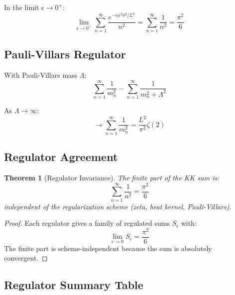 \documentclass[11pt,a4paper]{article}
\newtheorem{theorem}{Theorem}[section]
\begin{document}
In the limit $\epsilon \to 0^+$:
\begin{equation}
\label{eq:heat-kernel-limit}
\lim_{\epsilon \to 0^+} \sum_{n=1}^{\infty} \frac{e^{-\epsilon n^2 \pi^2/L^2}}{n^2} = \sum_{n=1}^{\infty} \frac{1}{n^2} = \frac{\pi^2}{6}
\end{equation}

\subsection{Pauli-Villars Regulator}
\label{subsec:pv-regulator}

With Pauli-Villars mass $\Lambda$:
\begin{equation}
\label{eq:pv-reg}
\sum_{n=1}^{\infty} \frac{1}{m_n^2} - \sum_{n=1}^{\infty} \frac{1}{m_n^2 + \Lambda^2}
\end{equation}

As $\Lambda \to \infty$:
\begin{equation}
\label{eq:pv-limit}
\to \sum_{n=1}^{\infty} \frac{1}{m_n^2} = \frac{L^2}{\pi^2} \zeta(2)
\end{equation}

\subsection{Regulator Agreement}
\label{subsec:regulator-agreement}

\begin{theorem}[Regulator Invariance]
\label{thm:regulator-invariance}
The finite part of the KK sum is:
\begin{equation}
\label{eq:finite-part}
\sum_{n=1}^{\infty} \frac{1}{n^2} = \frac{\pi^2}{6}
\end{equation}
independent of the regularization scheme (zeta, heat kernel, Pauli-Villars).
\end{theorem}

\begin{proof}
Each regulator gives a family of regulated sums $S_\epsilon$ with:
\begin{equation}
\label{eq:regulator-family}
\lim_{\epsilon \to 0} S_\epsilon = \frac{\pi^2}{6}
\end{equation}
The finite part is scheme-independent because the sum is absolutely convergent.
\end{proof}

\subsection{Regulator Summary Table}
\label{subsec:regulator-table}
\end{document}
